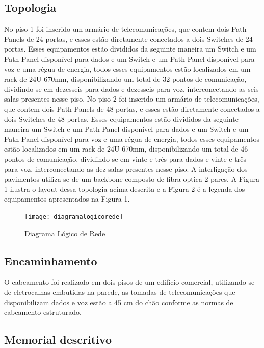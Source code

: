 \documentclass[	DIV=calc,%
							paper=a4,%
							fontsize=12pt,%
							onecolumn]{scrartcl}	 					%
\begin{document}
\subsection{Topologia}

No piso 1 foi inserido um armário de telecomunicações, que contem dois Path Panels
de 24 portas, e esses estão diretamente conectados a dois Switches de 24 portas. Esses
equipamentos estão divididos da seguinte maneira um Switch e um Path Panel disponível
para dados e um Switch e um Path Panel disponível para voz e uma régua de energia, todos
esses equipamentos estão localizados em um rack de 24U 670mm, disponibilizando um
total de 32 pontos de comunicação, dividindo-se em dezesseis para dados e dezesseis para
voz, interconectando as seis salas presentes nesse piso. No piso 2 foi inserido um armário
de telecomunicações, que contem dois Path Panels de 48 portas, e esses estão diretamente
conectados a dois Switches de 48 portas. Esses equipamentos estão divididos da seguinte
maneira um Switch e um Path Panel disponível para dados e um Switch e um Path Panel
disponível para voz e uma régua de energia, todos esses equipamentos estão localizados
em um rack de 24U 670mm, disponibilizando um total de 46 pontos de comunicação,
dividindo-se em vinte e três para dados e vinte e três para voz, interconectando as dez salas
presentes nesse piso. A interligação dos pavimentos utiliza-se de um backbone composto
de fibra optica 2 pares. A Figura 1 ilustra o layout dessa topologia acima descrita e a
Figura 2 é a legenda dos equipamentos apresentados na Figura 1.





\begin{figure}
	\centering
	\texttt{[image: diagramalogicorede]}
	\caption{Diagrama Lógico de Rede }
	\label{fig:diagramalogicorede}
\end{figure}
\subsection{Encaminhamento}

	
O cabeamento foi realizado em dois pisos de um edifício comercial, utilizando-se de
eletrocalhas embutidas na parede, as tomadas de telecomunicações que disponibilizam
dados e voz estão a 45 cm do chão conforme as normas de cabeamento estruturado.
\subsection{Memorial descritivo}
\end{document}
